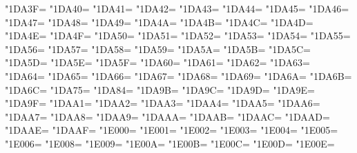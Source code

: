 \XeTeXcharclass"1DA3F=\KclassCM
\XeTeXcharclass"1DA40=\KclassCM
\XeTeXcharclass"1DA41=\KclassCM
\XeTeXcharclass"1DA42=\KclassCM
\XeTeXcharclass"1DA43=\KclassCM
\XeTeXcharclass"1DA44=\KclassCM
\XeTeXcharclass"1DA45=\KclassCM
\XeTeXcharclass"1DA46=\KclassCM
\XeTeXcharclass"1DA47=\KclassCM
\XeTeXcharclass"1DA48=\KclassCM
\XeTeXcharclass"1DA49=\KclassCM
\XeTeXcharclass"1DA4A=\KclassCM
\XeTeXcharclass"1DA4B=\KclassCM
\XeTeXcharclass"1DA4C=\KclassCM
\XeTeXcharclass"1DA4D=\KclassCM
\XeTeXcharclass"1DA4E=\KclassCM
\XeTeXcharclass"1DA4F=\KclassCM
\XeTeXcharclass"1DA50=\KclassCM
\XeTeXcharclass"1DA51=\KclassCM
\XeTeXcharclass"1DA52=\KclassCM
\XeTeXcharclass"1DA53=\KclassCM
\XeTeXcharclass"1DA54=\KclassCM
\XeTeXcharclass"1DA55=\KclassCM
\XeTeXcharclass"1DA56=\KclassCM
\XeTeXcharclass"1DA57=\KclassCM
\XeTeXcharclass"1DA58=\KclassCM
\XeTeXcharclass"1DA59=\KclassCM
\XeTeXcharclass"1DA5A=\KclassCM
\XeTeXcharclass"1DA5B=\KclassCM
\XeTeXcharclass"1DA5C=\KclassCM
\XeTeXcharclass"1DA5D=\KclassCM
\XeTeXcharclass"1DA5E=\KclassCM
\XeTeXcharclass"1DA5F=\KclassCM
\XeTeXcharclass"1DA60=\KclassCM
\XeTeXcharclass"1DA61=\KclassCM
\XeTeXcharclass"1DA62=\KclassCM
\XeTeXcharclass"1DA63=\KclassCM
\XeTeXcharclass"1DA64=\KclassCM
\XeTeXcharclass"1DA65=\KclassCM
\XeTeXcharclass"1DA66=\KclassCM
\XeTeXcharclass"1DA67=\KclassCM
\XeTeXcharclass"1DA68=\KclassCM
\XeTeXcharclass"1DA69=\KclassCM
\XeTeXcharclass"1DA6A=\KclassCM
\XeTeXcharclass"1DA6B=\KclassCM
\XeTeXcharclass"1DA6C=\KclassCM
\XeTeXcharclass"1DA75=\KclassCM
\XeTeXcharclass"1DA84=\KclassCM
\XeTeXcharclass"1DA9B=\KclassCM
\XeTeXcharclass"1DA9C=\KclassCM
\XeTeXcharclass"1DA9D=\KclassCM
\XeTeXcharclass"1DA9E=\KclassCM
\XeTeXcharclass"1DA9F=\KclassCM
\XeTeXcharclass"1DAA1=\KclassCM
\XeTeXcharclass"1DAA2=\KclassCM
\XeTeXcharclass"1DAA3=\KclassCM
\XeTeXcharclass"1DAA4=\KclassCM
\XeTeXcharclass"1DAA5=\KclassCM
\XeTeXcharclass"1DAA6=\KclassCM
\XeTeXcharclass"1DAA7=\KclassCM
\XeTeXcharclass"1DAA8=\KclassCM
\XeTeXcharclass"1DAA9=\KclassCM
\XeTeXcharclass"1DAAA=\KclassCM
\XeTeXcharclass"1DAAB=\KclassCM
\XeTeXcharclass"1DAAC=\KclassCM
\XeTeXcharclass"1DAAD=\KclassCM
\XeTeXcharclass"1DAAE=\KclassCM
\XeTeXcharclass"1DAAF=\KclassCM
\XeTeXcharclass"1E000=\KclassCM
\XeTeXcharclass"1E001=\KclassCM
\XeTeXcharclass"1E002=\KclassCM
\XeTeXcharclass"1E003=\KclassCM
\XeTeXcharclass"1E004=\KclassCM
\XeTeXcharclass"1E005=\KclassCM
\XeTeXcharclass"1E006=\KclassCM
\XeTeXcharclass"1E008=\KclassCM
\XeTeXcharclass"1E009=\KclassCM
\XeTeXcharclass"1E00A=\KclassCM
\XeTeXcharclass"1E00B=\KclassCM
\XeTeXcharclass"1E00C=\KclassCM
\XeTeXcharclass"1E00D=\KclassCM
\XeTeXcharclass"1E00E=\KclassCM
